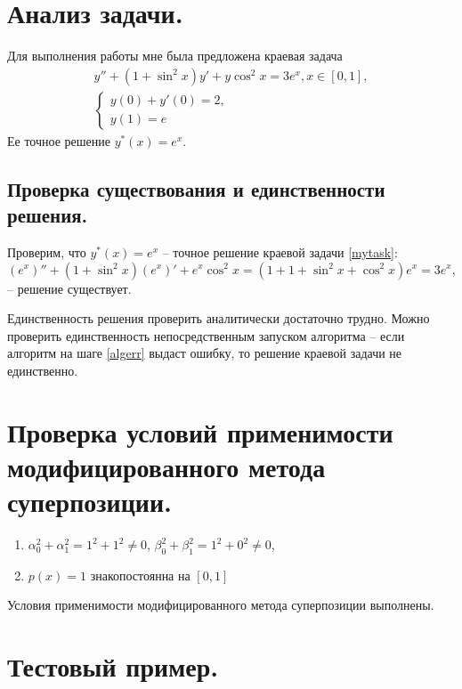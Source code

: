 \documentclass[a4paper, 12pt]{article}
\begin{document}
	\section{Анализ задачи.}
	
	Для выполнения работы мне была предложена краевая задача
	\begin{equation} \label{mytask}
		\begin{gathered}
			y''+(1+\sin^2x)y'+y\cos^2x=3e^x, x\in[0,1],\\
			\begin{cases}
				y(0)+y'(0)=2,\\
				y(1)=e
			\end{cases}
		\end{gathered}
	\end{equation}
	Ее точное решение $y^*(x)=e^x$. 
	
	\subsection{Проверка существования и единственности решения.}
	\label{solexistance}
	
	Проверим, что $y^*(x)=e^x$ -- точное решение краевой задачи \eqref{mytask}:
	\begin{equation*}
		(e^x)''+(1+\sin^2x)(e^x)'+e^x\cos^2x=(1+1+\sin^2x+\cos^2x)e^x=3e^x,
	\end{equation*}
	-- решение существует.
	
	Единственность решения проверить аналитически достаточно трудно. Можно проверить единственность непосредственным запуском алгоритма -- если алгоритм на шаге \ref{algerr} выдаст ошибку, то решение краевой задачи не единственно.
	
	\section{Проверка условий применимости модифицированного метода суперпозиции.}
	
	\begin{enumerate}
		\item $\alpha_0^2+\alpha_1^2=1^2+1^2\neq0$, $\beta_0^2+\beta_1^2=1^2+0^2\neq0$,
		\item $p(x)=1$ знакопостоянна на $[0,1]$
	\end{enumerate}
	
	Условия применимости модифицированного метода суперпозиции выполнены.
	
	\section{Тестовый пример.} \label{testexample}
	
\end{document}
